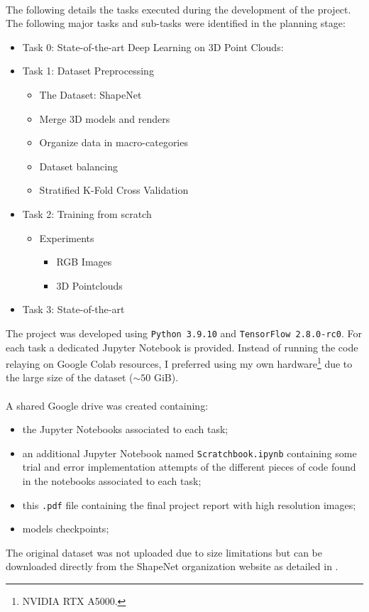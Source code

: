 \documentclass[11pt,a4paper]{article}
\begin{document}
\\
The following details the tasks executed during the development of the project. The following major tasks and sub-tasks were identified in the planning stage:
\begin{itemize}
    \item Task 0: State-of-the-art Deep Learning on 3D Point Clouds:
    \item Task 1: Dataset Preprocessing
        \begin{itemize}
            \item The Dataset: ShapeNet
            \item Merge 3D models and renders
            \item Organize data in macro-categories
            \item Dataset balancing
            \item Stratified K-Fold Cross Validation
        \end{itemize}
    \item Task 2: Training from scratch
        \begin{itemize}
            \item Experiments
            \begin{itemize}
                \item RGB Images
                \item 3D Pointclouds
            \end{itemize}
        \end{itemize}
    \item Task 3: State-of-the-art
\end{itemize}
The project was developed using \texttt{Python 3.9.10} and \texttt{TensorFlow 2.8.0-rc0}. For each task a dedicated Jupyter Notebook is provided. Instead of running the code relaying on Google Colab resources, I preferred using my own hardware\footnote{NVIDIA RTX A5000.} due to the large size of the dataset ($\sim 50$ GiB).\\
\\
A shared Google drive was created containing:
\begin{itemize}
    \item the Jupyter Notebooks associated to each task;
    \item an additional Jupyter Notebook named \texttt{Scratchbook.ipynb} containing some trial and error implementation attempts of the different pieces of code found in the notebooks associated to each task;
    \item this \texttt{.pdf} file containing the final project report with high resolution images;
    \item models checkpoints;
\end{itemize}
The original dataset was not uploaded due to size limitations but can be downloaded directly from the ShapeNet organization website as detailed in .
\end{document}
